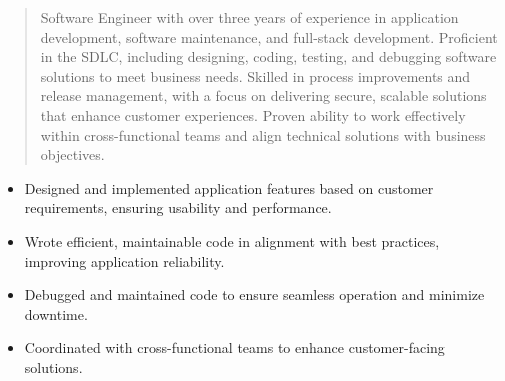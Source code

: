 



\makecvheader

\begin{quote}
  \noindent
  Software Engineer with over three years of experience in application development, software maintenance, and full-stack development. Proficient in the SDLC, including designing, coding, testing, and debugging software solutions to meet business needs. Skilled in process improvements and release management, with a focus on delivering secure, scalable solutions that enhance customer experiences. Proven ability to work effectively within cross-functional teams and align technical solutions with business objectives.
\end{quote}

\par\smallskip
\noindent
\begin{minipage}{20cm}
  \begin{minipage}{9.75cm}
    \begin{itemize}
      \item Designed and implemented application features based on customer requirements, ensuring usability and performance.
      \item Wrote efficient, maintainable code in alignment with best practices, improving application reliability.
    \end{itemize}
  \end{minipage}
  \hfill
  \begin{minipage}{9.75cm}
    \begin{itemize}
      \item Debugged and maintained code to ensure seamless operation and minimize downtime.
      \item Coordinated with cross-functional teams to enhance customer-facing solutions.
    \end{itemize}
  \end{minipage}
\end{minipage}
\par\smallskip
\divider

